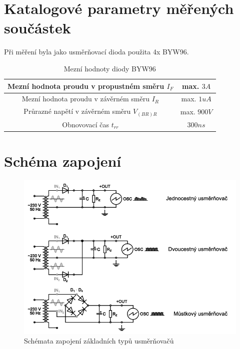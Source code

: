 \documentclass[12pt]{article} %
\begin{document}
\section{Katalogové parametry měřených součástek}
Při měření byla jako usměrňovací dioda použita 4x BYW96.
\begin{table}[H]
\caption{Mezní hodnoty diody BYW96}
\begin{tabular}{|c|c|}
\hline 
Mezní hodnota proudu v propustném směru $I_F$ & max. $3 A$ \\ 
\hline 
Mezní hodnota proudu v závěrném směru $I_R$ & max. $1 uA$ \\ 
\hline 
Průrazné napětí v závěrném směru $V_{(BR)R}$ & max. $900 V$ \\ 
\hline 
Obnovovací čas $t_{rr}$ & $300 ns$ \\ 
\hline 
\end{tabular} 
\end{table}

\section{Schéma zapojení}
\begin{figure}[H]
\includegraphics[scale=0.8]{schema.png}
\caption{Schémata zapojení základních typů usměrňovačů}
\end{figure}
\end{document}

